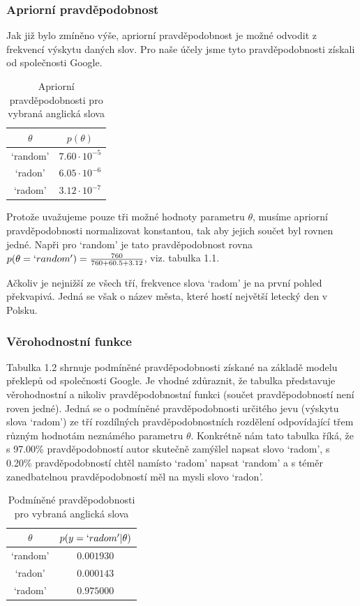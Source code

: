 \subsubsection{Apriorní pravděpodobnost}

Jak již bylo zmíněno výše, apriorní pravděpodobnost je možné odvodit z frekvencí výskytu daných slov. Pro naše účely jsme tyto pravděpodobnosti získali od společnosti Google.
\begin{table}
\begin{center}
\begin{tabular}{c c}
$\theta$ & $p(\theta)$\\
\hline
`random' & $7.60 \cdot 10^{-5}$\\
`radon' & $6.05 \cdot 10^{-6}$\\ 
`radom' & $3.12 \cdot 10^{-7}$\\ 
\end{tabular}
\caption{Apriorní pravděpodobnosti pro vybraná anglická slova}
\end{center}
\end{table}
Protože uvažujeme pouze tři možné hodnoty parametru $\theta$, musíme apriorní pravděpodobnosti normalizovat konstantou, tak aby jejich součet byl rovnen jedné. Napři pro `random' je tato pravděpodobnost rovna $p(\theta = `random') = \frac{760}{760 + 60.5 + 3.12}$, viz. tabulka 1.1.

Ačkoliv je nejnižší ze všech tří, frekvence slova `radom' je na první pohled překvapivá. Jedná se však o název města, které hostí největší letecký den v Polsku.

\subsubsection{Věrohodnostní funkce}

Tabulka 1.2 shrnuje podmíněné pravděpodobnosti získané na základě modelu překlepů od společnosti Google. Je vhodné zdůraznit, že tabulka představuje věrohodnostní a nikoliv pravděpodobnostní funkci (součet pravděpodobností není roven jedné). Jedná se o podmíněné pravděpodobnosti určitého jevu (výskytu slova `radom') ze tří rozdílných pravděpodobnostních rozdělení odpovídající třem různým hodnotám neznámého parametru $\theta$. Konkrétně nám tato tabulka říká, že s 97.00\% pravděpodobností autor skutečně zamýšlel napsat slovo `radom', s 0.20\% pravděpodobností chtěl namísto `radom' napsat `random' a s téměr zanedbatelnou pravděpodobností měl na mysli slovo `radon'.

\begin{table}
\begin{center}
\begin{tabular}{c c}
$\theta$ & $p(y = `radom' | \theta)$\\
\hline
`random' & $0.001930$\\
`radon' & $0.000143$\\ 
`radom' & $0.975000$\\ 
\end{tabular}
\caption{Podmíněné pravděpodobnosti pro vybraná anglická slova}
\end{center}
\end{table}

